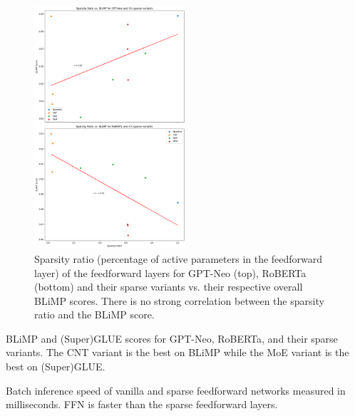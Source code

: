 \begin{figure}[!h]
    \centering
    \includegraphics[width=0.5\textwidth]{sparsity_ratio.png}
    \caption{Sparsity ratio (percentage of active parameters in the feedforward layer) of the feedforward layers for GPT-Neo (top), RoBERTa (bottom) and their sparse variants vs. their respective overall BLiMP scores. There is no strong correlation between the sparsity ratio and the BLiMP score.}
    \label{fig:spar-rat}
\end{figure}

\begin{table}[h]
    \caption{BLiMP and (Super)GLUE scores for GPT-Neo, RoBERTa, and their sparse variants. The CNT variant is the best on BLiMP while the MoE variant is the best on (Super)GLUE.}
    \label{tab:summary_eval}
    \centering
    \tiny
    
\end{table}

\begin{table}[h]
    \caption{Batch inference speed of vanilla and sparse feedforward networks measured in milliseconds. FFN is faster than the sparse feedforward layers.}
    \label{tab:inference}
    \centering
    
\end{table}